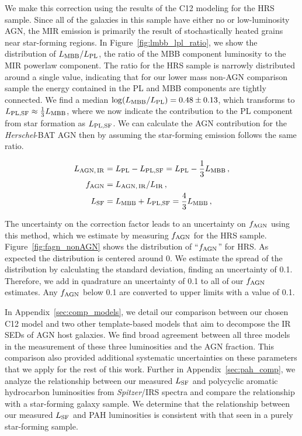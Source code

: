 \documentclass[fleqn, usenatbib]{mnras}
\newcommand{\herschel}{\emph{Herschel}}
\begin{document}
We make this correction using the results of the C12 modeling for the HRS sample. Since all of the galaxies in this sample have either no or low-luminosity AGN, the MIR emission is primarily the result of stochastically heated grains near star-forming regions. In Figure~\ref{fig:lmbb_lpl_ratio}, we show the distribution of $L_{\rm MBB}/L_{\rm PL}$, the ratio of the MBB component luminosity to the MIR powerlaw component. The ratio for the HRS sample is narrowly distributed around a single value, indicating that for our lower mass non-AGN comparison sample the energy contained in the PL and MBB components are tightly connected. We find a median $\log(L_{\rm MBB}/L_{\rm PL})=0.48 \pm 0.13$, which transforms to $L_{\rm PL,SF} \approx \frac{1}{3}L_{\rm MBB}$, where we now indicate the contribution to the PL component from star formation as  $L_{\rm PL,SF}$. We can calculate the AGN contribution for the \herschel-BAT AGN then by assuming the star-forming emission follows the same ratio.

\begin{align}
L_{\rm AGN,\,IR} &= L_{\rm PL} - L_{\rm PL, SF} = L_{\rm PL} - \frac{1}{3}L_{\rm MBB} \label{eq:c12_lagnIR}\,, \\
f_{\rm AGN} &= L_{\rm AGN, \, IR}/L_{\rm IR} \label{eq:c12_fagn}\,, \\
L_{\rm SF} &= L_{\rm MBB} + L_{\rm PL,SF} =  \frac{4}{3}L_{\rm MBB} \label{eq:c12_lsf}\,,
\end{align}

The uncertainty on the correction factor leads to an uncertainty on $f_{\rm AGN}$ using this method, which we estimate by measuring $f_{\rm AGN}$ for the HRS sample. Figure~\ref{fig:fagn_nonAGN} shows the distribution of ``$f_{\rm AGN}$'' for HRS. As expected the distribution is centered around 0. We estimate the spread of the distribution by calculating the standard deviation, finding an uncertainty of 0.1. Therefore, we add in quadrature an uncertainty of 0.1 to all of our $f_{\rm AGN}$ estimates. Any $f_{\rm AGN}$ below 0.1 are converted to upper limits with a value of 0.1. 

In Appendix~\ref{sec:comp_models}, we detail our comparison between our chosen C12 model and two other template-based models that aim to decompose the IR SEDs of AGN host galaxies. We find broad agreement between all three models in the measurement of these three luminosities and the AGN fraction. This comparison also provided additional systematic uncertainties on these parameters that we apply for the rest of this work. Further in Appendix~\ref{sec:pah_comp}, we analyze the relationship between our measured $L_{\rm SF}$ and polycyclic aromatic hydrocarbon luminosities from \textit{Spitzer}/IRS spectra and compare the relationship with a star-forming galaxy sample. We determine that the relationship between our measured $L_{\rm SF}$ and PAH luminosities is consistent with that seen in a purely star-forming sample.
 
\end{document}

